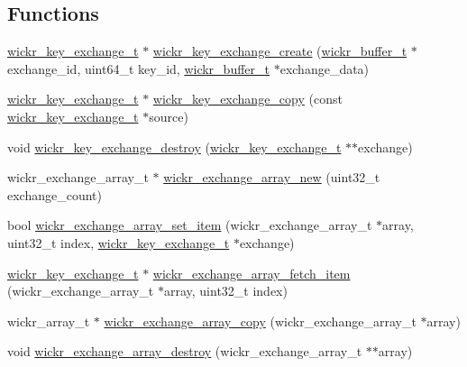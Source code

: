 \subsection*{Functions}
\begin{DoxyCompactItemize}
\item 
\mbox{\hyperlink{structwickr__key__exchange}{wickr\+\_\+key\+\_\+exchange\+\_\+t}} $\ast$ \mbox{\hyperlink{group__wickr__key__exchange_ga109887d90e18dd4a906926822a1048ba}{wickr\+\_\+key\+\_\+exchange\+\_\+create}} (\mbox{\hyperlink{structwickr__buffer}{wickr\+\_\+buffer\+\_\+t}} $\ast$exchange\+\_\+id, uint64\+\_\+t key\+\_\+id, \mbox{\hyperlink{structwickr__buffer}{wickr\+\_\+buffer\+\_\+t}} $\ast$exchange\+\_\+data)
\item 
\mbox{\hyperlink{structwickr__key__exchange}{wickr\+\_\+key\+\_\+exchange\+\_\+t}} $\ast$ \mbox{\hyperlink{group__wickr__key__exchange_ga2235a7c168e3806aa1a71b5a5c8dee48}{wickr\+\_\+key\+\_\+exchange\+\_\+copy}} (const \mbox{\hyperlink{structwickr__key__exchange}{wickr\+\_\+key\+\_\+exchange\+\_\+t}} $\ast$source)
\item 
void \mbox{\hyperlink{group__wickr__key__exchange_ga54b6481f8f4b61fb949bec17d47cd3de}{wickr\+\_\+key\+\_\+exchange\+\_\+destroy}} (\mbox{\hyperlink{structwickr__key__exchange}{wickr\+\_\+key\+\_\+exchange\+\_\+t}} $\ast$$\ast$exchange)
\item 
wickr\+\_\+exchange\+\_\+array\+\_\+t $\ast$ \mbox{\hyperlink{group__wickr__key__exchange_ga907d700b76b748f80796b4404c7172c2}{wickr\+\_\+exchange\+\_\+array\+\_\+new}} (uint32\+\_\+t exchange\+\_\+count)
\item 
bool \mbox{\hyperlink{group__wickr__key__exchange_gad3c6687c07ae5e66efcbc55da0febd85}{wickr\+\_\+exchange\+\_\+array\+\_\+set\+\_\+item}} (wickr\+\_\+exchange\+\_\+array\+\_\+t $\ast$array, uint32\+\_\+t index, \mbox{\hyperlink{structwickr__key__exchange}{wickr\+\_\+key\+\_\+exchange\+\_\+t}} $\ast$exchange)
\item 
\mbox{\hyperlink{structwickr__key__exchange}{wickr\+\_\+key\+\_\+exchange\+\_\+t}} $\ast$ \mbox{\hyperlink{group__wickr__key__exchange_ga333510c3c7eeb8e33f94495de6bb122d}{wickr\+\_\+exchange\+\_\+array\+\_\+fetch\+\_\+item}} (wickr\+\_\+exchange\+\_\+array\+\_\+t $\ast$array, uint32\+\_\+t index)
\item 
wickr\+\_\+array\+\_\+t $\ast$ \mbox{\hyperlink{group__wickr__key__exchange_gacd04405337871aa3bcd550a051d778e1}{wickr\+\_\+exchange\+\_\+array\+\_\+copy}} (wickr\+\_\+exchange\+\_\+array\+\_\+t $\ast$array)
\item 
void \mbox{\hyperlink{group__wickr__key__exchange_gadc1e5f5836bc09c1d6b8d6203d02a0eb}{wickr\+\_\+exchange\+\_\+array\+\_\+destroy}} (wickr\+\_\+exchange\+\_\+array\+\_\+t $\ast$$\ast$array)
\end{DoxyCompactItemize}


